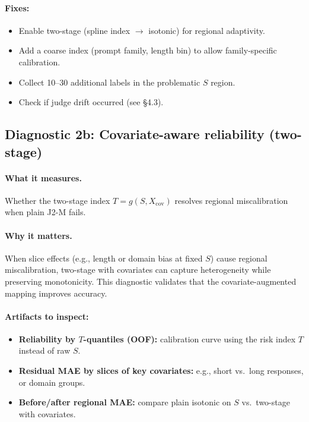 \paragraph{Fixes:}
\begin{itemize}
\item Enable two-stage \autocal{} (spline index $\to$ isotonic) for regional adaptivity.
\item Add a coarse index (prompt family, length bin) to allow family-specific calibration.
\item Collect 10--30 additional labels in the problematic $S$ region.
\item Check if judge drift occurred (see §4.3).
\end{itemize}

\subsection{Diagnostic 2b: Covariate-aware reliability (two-stage)}

\paragraph{What it measures.} Whether the two-stage index $T=g(S,X_{\mathrm{cov}})$ resolves regional miscalibration when plain J2-M fails.

\paragraph{Why it matters.} When slice effects (e.g., length or domain bias at fixed $S$) cause regional miscalibration, two-stage \autocal{} with covariates can capture heterogeneity while preserving monotonicity. This diagnostic validates that the covariate-augmented mapping improves accuracy.

\paragraph{Artifacts to inspect:}
\begin{itemize}
\item \textbf{Reliability by $T$-quantiles (OOF):} calibration curve using the risk index $T$ instead of raw $S$.
\item \textbf{Residual MAE by slices of key covariates:} e.g., short vs.\ long responses, or domain groups.
\item \textbf{Before/after regional MAE:} compare plain isotonic on $S$ vs.\ two-stage with covariates.
\end{itemize}

